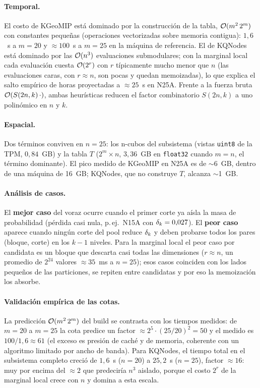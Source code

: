 \documentclass[11pt,letterpaper]{article}
\begin{document}
\paragraph{Temporal.} El costo de KGeoMIP está dominado por la construcción de
la tabla, $\mathcal{O}(m^2\,2^m)$ con constantes pequeñas (operaciones vectorizadas
sobre memoria contigua): $1{,}6$~s a $m=20$ y $\approx 100$~s a $m=25$ en la
máquina de referencia. El de KQNodes está dominado por las $\mathcal{O}(n^3)$
evaluaciones submodulares; con la marginal local cada evaluación cuesta
$\mathcal{O}(2^r)$ con $r$ típicamente mucho menor que $n$ (las evaluaciones caras,
con $r\approx n$, son pocas y quedan memoizadas), lo que explica el salto
empírico de horas proyectadas a $\approx 25$~s en N25A. Frente a la fuerza bruta
$\mathcal{O}(S(2n,k)\,\cdot)$, ambas heurísticas reducen el factor combinatorio
$S(2n,k)$ a uno polinómico en $n$ y $k$.

\paragraph{Espacial.} Dos términos conviven en $n=25$: los
n-cubos del subsistema (vistas \texttt{uint8} de la TPM, $0{,}84$~GB) y la
tabla $T$ ($2^m \times n$, $3{,}36$~GB en \texttt{float32} cuando $m=n$, el
término dominante). El pico medido de KGeoMIP en N25A es de
$\sim$6~GB, dentro de una máquina de 16~GB; KQNodes, que no construye $T$,
alcanza $\sim$1~GB.

\paragraph{Análisis de casos.} El \textbf{mejor caso} del voraz ocurre cuando el
primer corte ya aísla la masa de probabilidad (pérdida casi nula, p.\,ej.\ N15A
con $\delta_k=0{,}027$). El \textbf{peor caso} aparece cuando ningún corte del pool
reduce $\delta_k$ y deben probarse todos los pares (bloque, corte) en los $k-1$
niveles. Para la marginal local el peor caso por candidata es un bloque que
descarta casi todas las dimensiones ($r\approx n$, un promedio de $2^{24}$
valores $\approx 35$~ms a $n=25$); esos casos coinciden con los lados pequeños
de las particiones, se repiten entre candidatas y por eso la memoización los
absorbe.

\paragraph{Validación empírica de las cotas.} La predicción
$\mathcal{O}(m^2\,2^m)$ del build se contrasta con los tiempos medidos: de $m=20$ a
$m=25$ la cota predice un factor $\approx 2^5\cdot(25/20)^2 = 50$ y el medido es
$100/1{,}6 \approx 61$ (el exceso es presión de caché y de memoria, coherente
con un algoritmo limitado por ancho de banda). Para KQNodes, el tiempo total en
el subsistema completo creció de $1{,}6$~s ($n=20$) a $25{,}2$~s ($n=25$), factor
$\approx 16$: muy por encima del $\approx 2$ que predeciría $n^3$ aislado, porque el
costo $2^r$ de la marginal local crece con $n$ y domina a esta escala.
\end{document}
